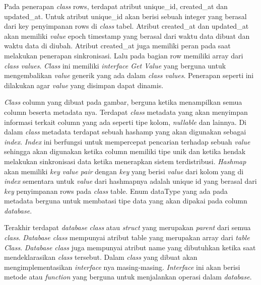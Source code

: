 Pada penerapan \emph{class} rows, terdapat atribut unique\_id, created\_at dan updated\_at. 
Untuk atribut unique\_id akan berisi sebuah integer yang berasal dari key penyimpanan 
rows di \emph{class} tabel. Atribut created\_at dan updated\_at akan memiliki \emph{value} epoch 
timestamp yang berasal dari waktu data dibuat dan waktu data di diubah. Atribut 
created\_at juga memiliki peran pada saat melakukan penerapan sinkronisasi. Lalu pada 
bagian row memiliki array dari \emph{class values}. \emph{Class} ini memiliki \emph{interface Get Value} 
yang berguna untuk mengembalikan \emph{value} generik yang ada dalam \emph{class values}. Penerapan 
seperti ini dilakukan agar \emph{value} yang disimpan dapat dinamis. 

\emph{Class} column yang dibuat pada gambar, berguna ketika menampilkan semua column beserta 
metadata nya. Terdapat \emph{class} metadata yang akan menyimpan informasi terkait column 
yang ada seperti tipe kolom, \emph{nullable} dan lainnya. Di dalam \emph{class} metadata terdapat 
sebuah hashamp yang akan digunakan sebagai \emph{index}. \emph{Index} ini berfungsi untuk mempercepat 
pencarian terhadap sebuah \emph{value} sehingga akan digunakan ketika column memiliki tipe 
unik dan ketika hendak melakukan sinkronisasi data ketika menerapkan sistem 
terdistribusi. \emph{Hashmap} akan memiliki \emph{key value pair} dengan \emph{key} yang berisi \emph{value} dari 
kolom yang di \emph{index} sementara untuk \emph{value} dari hashmapnya adalah unique id yang 
berasal dari \emph{key} penyimpanan rows pada \emph{class} table. Enum dataType yang ada pada 
metadata berguna untuk membatasi tipe data yang akan dipakai pada column \emph{database}.

Terakhir terdapat \emph{database} \emph{class} atau \emph{struct} yang merupakan \emph{parent} dari semua \emph{class}. 
\emph{Database class} mempunyai atribut table yang merupakan array dari \emph{table} \emph{Class}. 
\emph{Database class} juga mempunyai atribut name yang dibutuhkan ketika saat 
mendeklarasikan \emph{class} tersebut. Dalam \emph{class} yang dibuat akan mengimplementasikan 
\emph{interface} nya masing-masing. \emph{Interface} ini akan berisi metode atau \emph{function} yang 
berguna untuk menjalankan operasi dalam \emph{database}.

